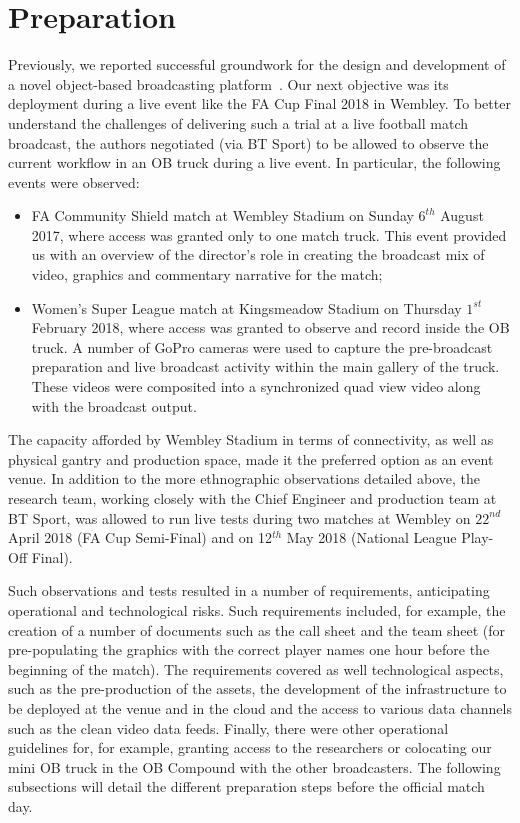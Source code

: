 \documentclass[sigchi-a, authorversion]{acmart}
\begin{document}
\section{Preparation}
Previously, we reported successful groundwork for the design and development
of a novel object-based broadcasting platform~\cite{kegel2017, Li:2018_CHI, Li:2018_TVX}.
Our next objective was its deployment during a live event like the FA Cup Final
2018 in Wembley. To better understand the challenges of delivering such a trial at
a live football match broadcast, the authors negotiated (via BT Sport) to be allowed
to observe the current workflow in an OB truck during a live event. In
particular, the following events were observed:

\begin{itemize}
  \item FA Community Shield match at Wembley Stadium on Sunday $6^{th}$ August 2017,
        where access was granted only to one match truck. This event provided us
        with an overview of the director's role in creating the broadcast mix of
        video, graphics and commentary narrative for the match;
  \item Women's Super League match at Kingsmeadow Stadium on Thursday $1^{st}$
        February 2018, where access was granted to observe and record inside the OB
        truck. A number of GoPro cameras were used to capture the pre-broadcast
        preparation and live broadcast activity within the main gallery of the
        truck. These videos were composited into a synchronized quad view video
        along with the broadcast output.
\end{itemize}

The capacity afforded by Wembley Stadium in terms of connectivity,
as well as physical gantry and production space, made it the preferred option as
an event venue. In addition to the more ethnographic observations detailed above,
the research team, working closely with the Chief Engineer and production team
at BT Sport, was allowed to run live tests during two matches at Wembley on $22^{nd}$
April 2018 (FA Cup Semi-Final) and on 12$^{th}$ May 2018 (National League Play-Off Final).

Such observations and tests resulted in a number of requirements, anticipating
operational and technological risks. Such requirements included, for example,
the creation of a number of documents such as the call sheet and the team sheet
(for pre-populating the graphics with the correct player names one hour before
the beginning of the match). The requirements covered as well technological
aspects, such as the pre-production of the assets, the development of the
infrastructure to be deployed at the venue and in the cloud and the access to
various data channels such as the clean video data feeds. Finally, there were
other operational guidelines for, for example, granting access to the researchers
or colocating our mini OB truck in the OB Compound with the other broadcasters.
The following subsections will detail the different preparation steps before the
official match day.
\end{document}
